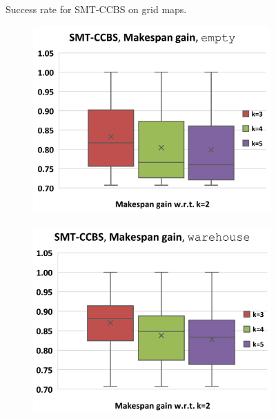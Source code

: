 \documentclass[review]{elsarticle}
\newcommand{\smtccbs}{SMT-CCBS\xspace}
\begin{document}
\begin{figure}[h]
\caption{Success rate for \smtccbs on grid maps.}
\label{fig:results-success-rate-smtcbs-grids}
\end{figure}

\begin{figure}[t]
\centering
    \begin{subfigure}
        \centering
        \includegraphics[width=0.45\linewidth]{mapfr-Makespan-plot-smtcbs-empty.pdf}
    \end{subfigure}\hspace{0.025\linewidth}%
    \begin{subfigure}
        \centering
        \includegraphics[width=0.45\linewidth]{mapfr-Makespan-plot-smtcbs-warehouse.pdf}
    \end{subfigure}%
    

\end{figure}
\end{document}
